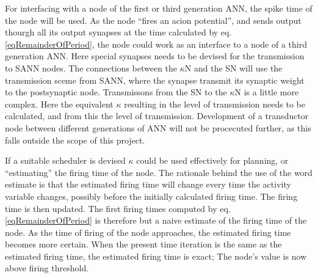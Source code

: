 	For interfacing with a node of the first or third generation ANN, the spike time of the node will be used. %
	As the node ``fires an acion potential'', and sends output thourgh all its output synapses at the time calculated by eq. \eqref{eqRemainderOfPeriod}, the node could work as an interface to a node of a third generation ANN. 
	Here special synapses needs to be devised for the transmission to SANN nodes. 
	The connections between the $\kappa$N and the SN will use the transmission sceme from SANN, where the synapse transmit its synaptic weight to the postsynaptic node. 
	Transmissons from the SN to  the $\kappa$N is a little more complex. Here the equivalent $\kappa$ resulting in the level of transmission needs to be calculated, and from this the level of transmission.
	Development of a transductor node between different generations of ANN will not be procecuted further, as this falls outside the scope of this project.

	
	If a suitable scheduler is devised $\kappa$ could be used effectively for planning, or ``estimating'' the firing time of the node.
	The rationale behind the use of the word estimate is that the estimated firing time will change every time the activity variable changes, possibly before the initially calculated firing time. 
	The firing time is then updated. 
	The first firing times computed by eq. \eqref{eqRemainderOfPeriod} is therefore but a naive estimate of the firing time of the node.
	As the time of firing of the node approaches, the estimated firing time becomes more certain.
	When the present time iteration is the same as the estimated firing time, the estimated firing time is exact; The node's value is now above firing threshold.
	

